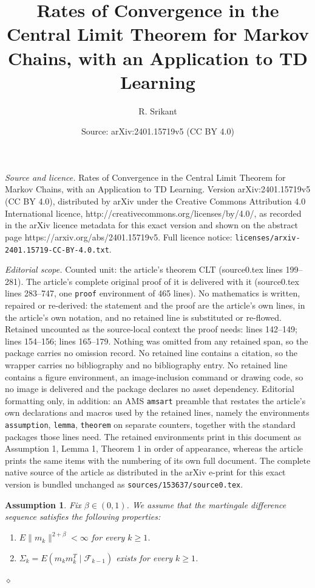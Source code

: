 \documentclass[10pt,a4paper]{amsart}
\title{Rates of Convergence in the Central Limit Theorem for Markov Chains, with an Application to TD Learning}
\author{R. Srikant}
\date{Source: arXiv:2401.15719v5 (CC BY 4.0)}
\newtheorem{assumption}{Assumption}
\begin{document}
\maketitle

\noindent\emph{Source and licence.} Rates of Convergence in the Central Limit Theorem for Markov Chains, with an Application to TD Learning. Version arXiv:2401.15719v5 (CC BY 4.0), distributed by arXiv under the Creative Commons Attribution 4.0 International licence, http://creativecommons.org/licenses/by/4.0/, as recorded in the arXiv licence metadata for this exact version and shown on the abstract page https://arxiv.org/abs/2401.15719v5. Full licence notice: \texttt{licenses/arxiv-2401.15719-CC-BY-4.0.txt}.\par\smallskip

\noindent\textit{Editorial scope.} Counted unit: the article's theorem CLT (source0.tex lines 199--281). The article's complete original proof of it is delivered with it (source0.tex lines 283--747, one \texttt{proof} environment of 465 lines). No mathematics is written, repaired or re-derived: the statement and the proof are the article's own lines, in the article's own notation, and no retained line is substituted or re-flowed.  Retained uncounted as the source-local context the proof needs: lines 142--149; lines 154--156; lines 165--179.  Nothing was omitted from any retained span, so the package carries no omission record.  No retained line contains a citation, so the wrapper carries no bibliography and no bibliography entry.  No retained line contains a figure environment, an image-inclusion command or drawing code, so no image is delivered and the package declares no asset dependency.  Editorial formatting only, in addition: an AMS \texttt{amsart} preamble that restates the article's own declarations and macros used by the retained lines, namely the environments \texttt{assumption}, \texttt{lemma}, \texttt{theorem} on separate counters, together with the standard packages those lines need.  The retained environments print in this document as Assumption 1, Lemma 1, Theorem 1 in order of appearance, whereas the article prints the same items with the numbering of its own full document.  The complete native source of the article as distributed in the arXiv e-print for this exact version is bundled unchanged as \texttt{sources/153637/source0.tex}.
\begin{assumption}\label{assume: martingale}
Fix $\beta\in(0,1)$. We assume that the martingale difference sequence satisfies the following properties:
\begin{enumerate}\label{assume}
\item $E\|m_k\|^{2+\beta}<\infty$ for every $k\geq 1$.
\item $\Sigma_k=E(m_km_k^T\mid\mathcal{F}_{k-1})$ exists for every $k\geq 1$.
\end{enumerate}
\hfill $\diamond$
\end{assumption}
\end{document}
